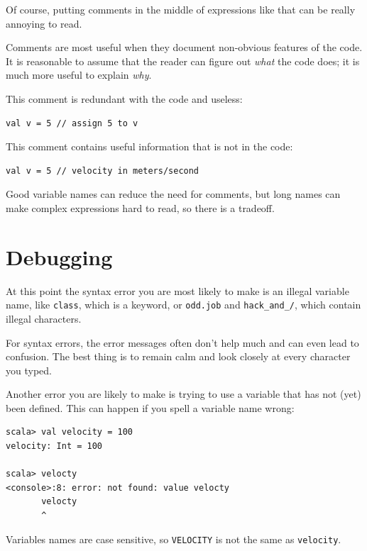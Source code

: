 \documentclass[10pt]{book}
\begin{document}
Of course, putting comments in the middle of expressions like that can be really 
annoying to read.

Comments are most useful when they document non-obvious features of
the code.  It is reasonable to assume that the reader can figure out
{\em what} the code does; it is much more useful to explain {\em why}.

This comment is redundant with the code and useless:

\beforeverb
\begin{verbatim}
val v = 5 // assign 5 to v
\end{verbatim}
\afterverb

This comment contains useful information that is not in the code:

\beforeverb
\begin{verbatim}
val v = 5 // velocity in meters/second
\end{verbatim}
\afterverb

Good variable names can reduce the need for comments, but
long names can make complex expressions hard to read, so there is
a tradeoff.

\section{Debugging}

At this point the syntax error you are most likely to make is
an illegal variable name, like {\tt class}, which
is a keyword, or \verb"odd.job" and \verb"hack_and_/", which contain
illegal characters.


For syntax errors, the error messages often don't help much and can even lead to confusion. The best thing is to remain calm and look closely at every character you typed.


Another error you are likely to make is trying to use a variable that has not (yet) been defined. This can happen if you spell a variable name wrong:

\beforeverb
\begin{verbatim}
scala> val velocity = 100
velocity: Int = 100

scala> velocty
<console>:8: error: not found: value velocty
       velocty
       ^
\end{verbatim}
\afterverb

Variables names are case sensitive, so {\tt VELOCITY} is not the
same as {\tt velocity}.
\end{document}
